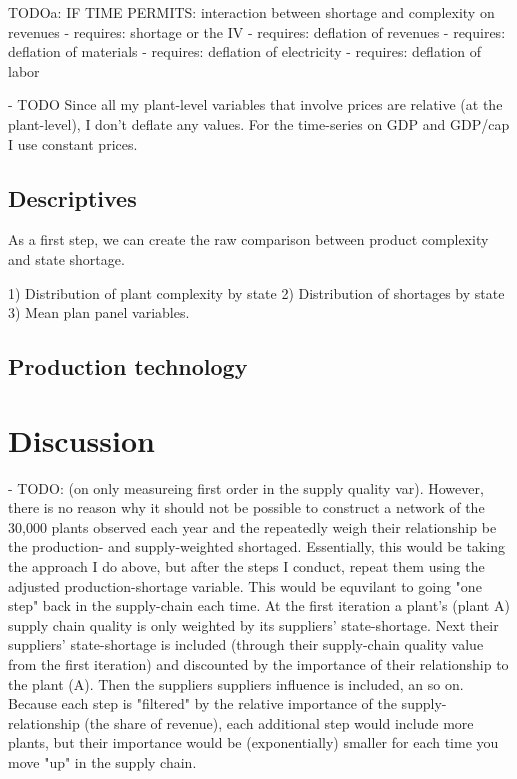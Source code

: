 \documentclass[11pt]{article}
\begin{document}
TODOa: IF TIME PERMITS: interaction between shortage and complexity on revenues - requires: shortage or the IV
 - requires: deflation of revenues
 - requires: deflation of materials
 - requires: deflation of electricity
 - requires: deflation of labor

 - TODO Since all my plant-level variables that involve prices are relative (at the plant-level), I don't deflate any values. For the time-series on GDP and GDP/cap I use constant prices.



\subsection{Descriptives}%
\label{sub:descriptives}

As a first step, we can create the raw comparison between product complexity and state shortage.

1) Distribution of plant complexity by state
2) Distribution of shortages by state
3) Mean plan panel variables.

\subsection{Production technology}%
\label{sub:production_technology}


\newpage

\section{Discussion}%
\label{sec:discussion}

- TODO: (on only measureing first order in the supply quality var). However, there is no reason why it should not be possible to construct a network of the ~ 30,000 plants observed each year and the repeatedly weigh their relationship be the production- and supply-weighted shortaged. Essentially, this would be taking the approach I do above, but after the steps I conduct, repeat them using the adjusted production-shortage variable. This would be equvilant to going "one step" back in the supply-chain each time. At the first iteration a plant's (plant A) supply chain quality is only weighted by its suppliers' state-shortage. Next their suppliers' state-shortage is included (through their supply-chain quality value from the first iteration) and discounted by the importance of their relationship to the plant (A). Then the suppliers suppliers influence is included, an so on. Because each step is "filtered" by the relative importance of the supply-relationship (the share of revenue), each additional step would include more plants, but their importance would be (exponentially) smaller for each time you move "up" in the supply chain. 
\end{document}
